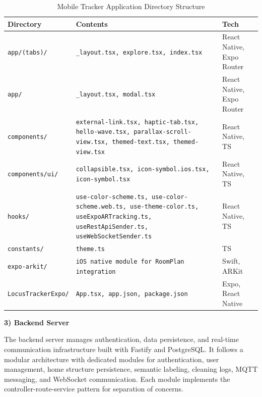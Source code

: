 \documentclass[conference]{IEEEtran}
\begin{document}
\begin{table}[H]
\caption{Mobile Tracker Application Directory Structure}
\def\arraystretch{1.2}
\footnotesize
\begin{tabular}{|>{\raggedright\arraybackslash}p{2.6cm}|>{\raggedright\arraybackslash}p{3.5cm}|p{1.4cm}|}
\hline
\textbf{Directory} & \textbf{Contents} & \textbf{Tech} \\
\hline
\texttt{app/(tabs)/} & \texttt{\_layout.tsx, explore.tsx, index.tsx} & React Native, Expo Router \\
\hline
\texttt{app/} & \texttt{\_layout.tsx, modal.tsx} & React Native, Expo Router \\
\hline
\texttt{components/} & \texttt{external-link.tsx, haptic-tab.tsx, hello-wave.tsx, parallax-scroll-view.tsx, themed-text.tsx, themed-view.tsx} & React Native, TS \\
\hline
\texttt{components/ui/} & \texttt{collapsible.tsx, icon-symbol.ios.tsx, icon-symbol.tsx} & React Native, TS \\
\hline
\texttt{hooks/} & \texttt{use-color-scheme.ts, use-color-scheme.web.ts, use-theme-color.ts, useExpoARTracking.ts, useRestApiSender.ts, useWebSocketSender.ts} & React Native, TS \\
\hline
\texttt{constants/} & \texttt{theme.ts} & TS \\
\hline
\texttt{expo-arkit/} & \texttt{iOS native module for RoomPlan integration} & Swift, ARKit \\
\hline
\texttt{LocusTrackerExpo/} & \texttt{App.tsx, app.json, package.json} & Expo, React Native \\
\hline
\end{tabular}
\end{table}

\textbf{3) Backend Server}

The backend server manages authentication, data persistence, and real-time communication infrastructure built with Fastify and PostgreSQL. It follows a modular architecture with dedicated modules for authentication, user management, home structure persistence, semantic labeling, cleaning logs, MQTT messaging, and WebSocket communication. Each module implements the controller-route-service pattern for separation of concerns.
\end{document}
